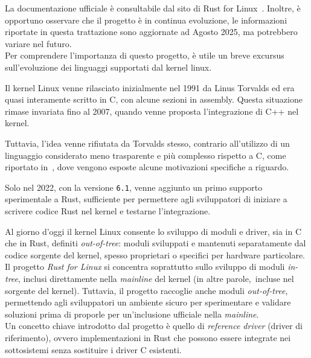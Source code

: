 La documentazione ufficiale è consultabile dal sito di Rust for Linux~\cite{rust-for-linux}. Inoltre, è opportuno osservare che il 
progetto è in continua evoluzione, le informazioni riportate in questa trattazione sono aggiornate ad Agosto 2025, ma potrebbero variare nel futuro. \hfill
\vspace{5pt} \\
\noindent Per comprendere l'importanza di questo progetto, è utile un breve excursus sull'evoluzione dei linguaggi supportati dal kernel linux.
\begin{framed}
\noindent Il kernel Linux venne rilasciato inizialmente nel 1991 da Linus Torvalds ed era quasi interamente scritto in C,
con alcune sezioni in assembly. Questa situazione rimase 
invariata fino al 2007, quando venne proposta l'integrazione di
C++ nel kernel. 

Tuttavia, l'idea venne rifiutata da Torvalds stesso,
contrario all'utilizzo di un linguaggio considerato meno trasparente e più complesso rispetto a C,
 come riportato in~\cite{linus-cpp}, dove vengono esposte alcune motivazioni specifiche a riguardo.

 Solo nel 2022, con la versione \texttt{6.1}, venne aggiunto un primo supporto sperimentale a Rust, sufficiente per permettere agli sviluppatori
di iniziare a scrivere codice Rust nel kernel e testarne l'integrazione.
\end{framed}
\noindent Al giorno d'oggi il kernel Linux consente lo sviluppo di moduli e driver, sia
in C che in Rust, definiti \textit{out-of-tree}: moduli sviluppati e mantenuti separatamente dal codice sorgente del kernel,
spesso proprietari o specifici per hardware particolare. \hfill
\vspace{7pt} \\
\noindent Il progetto \textit{Rust for Linux} si concentra soprattutto sullo sviluppo di moduli \textit{in-tree}, inclusi direttamente nella \textit{mainline} del kernel (in altre parole,\  incluse nel sorgente del kernel).
Tuttavia, il progetto raccoglie anche moduli \textit{out-of-tree}, permettendo agli sviluppatori un ambiente sicuro per sperimentare e validare 
soluzioni prima di proporle per un'inclusione ufficiale nella \textit{mainline}.\hfill 
\vspace{15pt}\\
\noindent Un concetto chiave introdotto dal progetto è quello di \textit{reference driver} (driver di riferimento), ovvero implementazioni in Rust che possono essere integrate 
nei sottosistemi senza sostituire i driver C esistenti.

